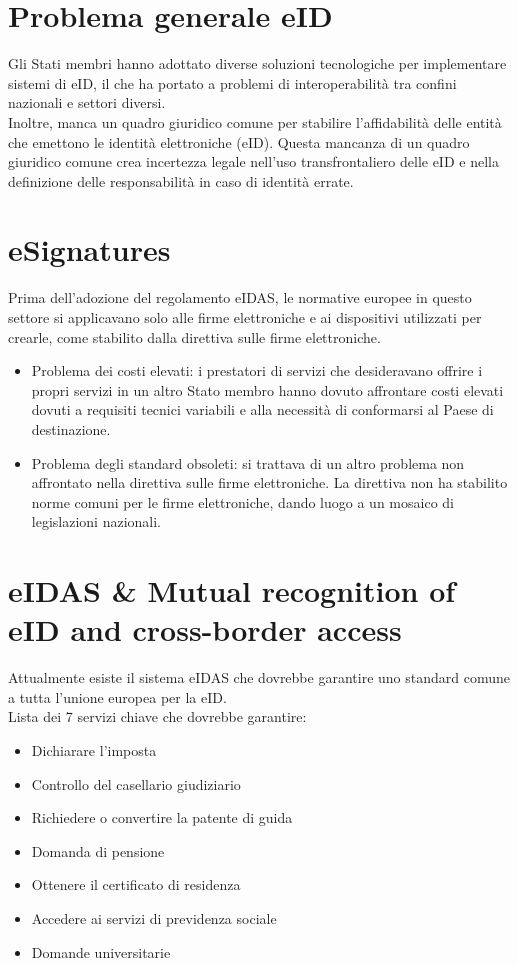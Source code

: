 \section{Problema generale eID}
Gli Stati membri hanno adottato diverse soluzioni tecnologiche per implementare sistemi di eID, il che ha portato a problemi di interoperabilità tra confini nazionali e settori diversi.\\
Inoltre, manca un quadro giuridico comune per stabilire l'affidabilità delle entità che emettono le identità elettroniche (eID). Questa mancanza di un quadro giuridico comune crea incertezza legale nell'uso transfrontaliero delle eID e nella definizione delle responsabilità in caso di identità errate.

\section{eSignatures}
Prima dell'adozione del regolamento eIDAS, le normative europee in questo settore si applicavano solo alle firme elettroniche e ai dispositivi utilizzati per crearle, come stabilito dalla direttiva sulle firme elettroniche.
\begin{itemize}
    \item Problema dei costi elevati: i prestatori di servizi che desideravano offrire i propri servizi in un altro Stato membro hanno dovuto affrontare costi elevati dovuti a requisiti tecnici variabili e alla necessità di conformarsi al Paese di destinazione.
    \item Problema degli standard obsoleti: si trattava di un altro problema non affrontato nella direttiva sulle firme elettroniche. La direttiva non ha stabilito norme comuni per le firme elettroniche, dando luogo a un mosaico di legislazioni nazionali.
    
\end{itemize}

\section{eIDAS \& Mutual recognition of eID and cross-border access}
Attualmente esiste il sistema eIDAS che dovrebbe garantire uno standard comune a tutta l'unione europea per la eID.\\
Lista dei 7 servizi chiave che dovrebbe garantire:
\begin{itemize}
    \item Dichiarare l'imposta
    \item Controllo del casellario giudiziario
    \item Richiedere o convertire la patente di guida
    \item Domanda di pensione
    \item Ottenere il certificato di residenza
    \item Accedere ai servizi di previdenza sociale
    \item Domande universitarie
\end{itemize}

